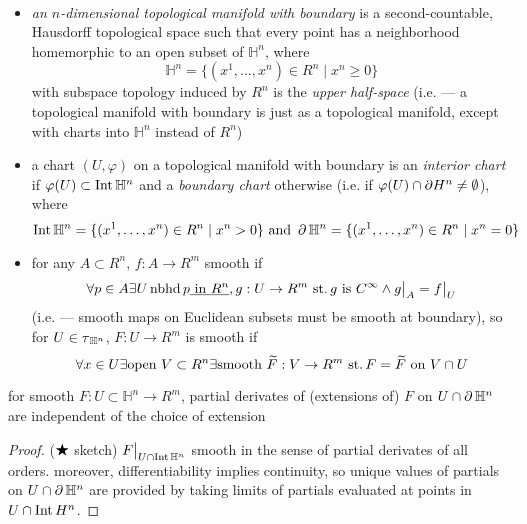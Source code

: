 \begin{defn}\
  \begin{itemize}
  \item
    \emph{an $n$-dimensional topological manifold with boundary}
    is a second-countable, Hausdorff topological space
    such that every point has a neighborhood homemorphic to
    an open subset of $\mathbb H^n$, where
    \[\mathbb H^n = \{(x^1,\ldots,x^n)\in R^n\mid x^n\geq 0\}\]
    with subspace topology induced by $R^n$ is
    the \emph{upper half-space}
    (i.e. --- a topological manifold with boundary is just as
    a topological manifold, except with charts into $\mathbb H^n$
    instead of $R^n$)
  \item
    a chart $(U,\varphi)$ on a topological manifold with boundary
    is an \emph{interior chart} if
    $\varphi(U)\subset\operatorname{Int}\mathbb H^n$
    and a \emph{boundary chart} otherwise
    (i.e. if $\varphi(U)\cap\mathbb {\operatorname{\partial}} H^n\neq\emptyset$),
    where
    \[
    \operatorname{Int}\mathbb H^n = \{(x^1,\ldots,x^n)\in R^n\mid x^n > 0\}
    \text{ and }
    \operatorname{\partial}\mathbb H^n = \{(x^1,\ldots,x^n)\in R^n\mid x^n = 0\}
    \]
  \item
    for any $A\subset R^n$, $f: A\rightarrow R^m$ smooth if
    \[
    \forall p\in A\exists U\nbhd p \underline{\text{ in } R^n},
    g: U\rightarrow R^m \st
    g \text{ is }C^\infty\land \restr{g}{A} = \restr{f}{U}
    \]
    (i.e. --- smooth maps on Euclidean subsets must be
    smooth at boundary), so for $U\in\operatorname{\tau}_{\mathbb H^n}$,
    $F: U\rightarrow R^m$ is smooth if
    \[
    \forall x\in U \exists\text{open } V\subset R^n
    \exists\text{smooth }\widetilde{F}: V\rightarrow R^m
    \operatorname{\,st.} F=\widetilde{F} \text{ on } V\cap U
    \]
  \end{itemize}
\end{defn}

\begin{rem}
  for smooth $F:U\subset\mathbb H^n\rightarrow R^m$,
  partial derivates of (extensions of) $F$ on
  $U\cap\operatorname{\partial}\mathbb H^n$ are independent of the choice of extension
\end{rem}
\begin{proof}
  ($\bigstar$ sketch) $\restr{F}{U\cap\Int\mathbb H^n}$ smooth
  in the sense of partial derivates of all orders.
  moreover, differentiability implies continuity,
  so unique values of partials on $U\cap\operatorname{\partial}\mathbb H^n$
  are provided by taking limits of partials evaluated at
  points in $U\cap\operatorname{Int} H^n$.
\end{proof}


